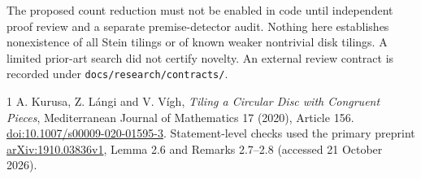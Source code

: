 \documentclass[11pt]{article}
\begin{document}
The proposed count reduction must not be enabled in code until independent
proof review and a separate premise-detector audit. Nothing here establishes
nonexistence of all Stein tilings or of known weaker nontrivial disk tilings.
A limited prior-art search did not certify novelty. An external review
contract is recorded under \texttt{docs/research/contracts/}.

\begin{thebibliography}{1}
A. Kurusa, Z. L\'angi and V. V\'igh,
\emph{Tiling a Circular Disc with Congruent Pieces},
Mediterranean Journal of Mathematics 17 (2020), Article 156.
\href{https://doi.org/10.1007/s00009-020-01595-3}{doi:10.1007/s00009-020-01595-3}.
Statement-level checks used the primary preprint
\href{https://arxiv.org/html/1910.03836}{arXiv:1910.03836v1},
Lemma 2.6 and Remarks 2.7--2.8 (accessed 21 October 2026).
\end{thebibliography}
\end{document}
